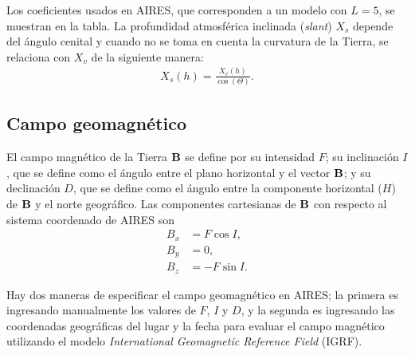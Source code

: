 	Los coeficientes usados en AIRES, que corresponden a un modelo con $L=5$, se muestran en la tabla. La profundidad atmosférica inclinada (\textit{slant}) $X_s$ depende del ángulo cenital y cuando no se toma en cuenta la curvatura de la Tierra, se relaciona con $X_v$ de la siguiente manera:
	\begin{align}
	X_s (h) = \frac{X_v (h)}{\cos(\Theta)}.
	\end{align}
	
	\subsection{Campo geomagnético}
	El campo magnético de la Tierra $\vb{B}$ se define por su intensidad $F$; su inclinación $I$, que se define como el ángulo entre el plano horizontal y el vector $\vb{B}$; y su declinación $D$, que se define como el ángulo entre la componente horizontal ($H$) de $\vb{B}$ y el norte geográfico. Las componentes cartesianas de $\vb{B}$ con respecto al sistema coordenado de AIRES son 
	\begin{align}
	B_x &= F \cos I, \\
	B_y &= 0, \\
	B_z &= -F \sin I.
	\end{align}	 
	
	Hay dos maneras de especificar el campo geomagnético en AIRES; la primera es ingresando manualmente los valores de $F$, $I$ y $D$, y la segunda es ingresando las coordenadas geográficas del lugar y la fecha para evaluar el campo magnético utilizando el modelo \textit{International Geomagnetic Reference Field} (IGRF).  	
	
	
	
